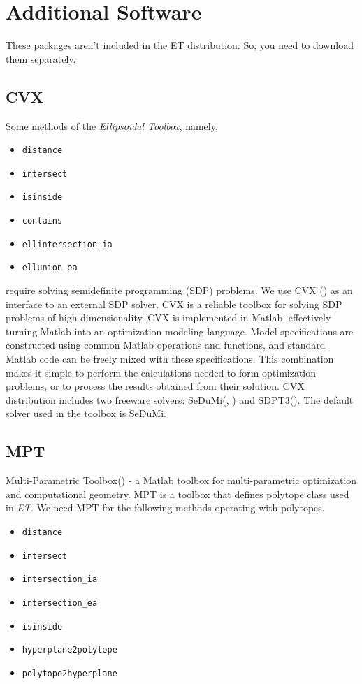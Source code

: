 \section{Additional Software}
These packages aren't included in the ET distribution.
So, you need to download them separately.
\subsection{CVX}
Some methods of the {\it Ellipsoidal Toolbox}, namely,
\begin{itemize}
\item {\tt distance}
\item {\tt intersect}
\item {\tt isinside}
\item {\tt contains}
\item {\tt ellintersection\_ia}
\item {\tt ellunion\_ea}
\end{itemize}
require solving semidefinite programming (SDP) problems.
We use CVX (\cite{cvxhp}) as an
interface to an external SDP solver. CVX is a reliable toolbox
for solving SDP problems of high dimensionality.
CVX is implemented in Matlab, effectively turning Matlab into an
optimization modeling language. Model specifications are constructed
using common Matlab operations and functions, and standard
Matlab code can be freely mixed with these specifications.
This combination makes it simple to perform the calculations needed
to form optimization problems, or to process the results
obtained from their solution. CVX distribution includes two freeware
solvers: SeDuMi(\cite{sedumi}, \cite{sedumihp})
and SDPT3(\cite{sdpt}). The default solver used in the toolbox is SeDuMi.

\subsection{MPT}
Multi-Parametric Toolbox(\cite{mpt}) - a Matlab toolbox for multi-parametric
optimization and computational geometry. MPT is a toolbox
that defines polytope class
used in {\it ET}. We need MPT for the following methods operating with polytopes.
\begin{itemize}
\item {\tt distance}
\item {\tt intersect}
\item {\tt intersection\_ia}
\item {\tt intersection\_ea}
\item {\tt isinside}
\item {\tt hyperplane2polytope}
\item {\tt polytope2hyperplane}
\end{itemize}



